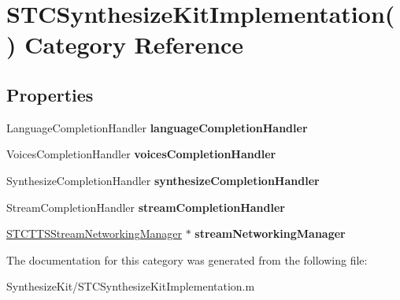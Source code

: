 \hypertarget{category_s_t_c_synthesize_kit_implementation_07_08}{}\section{S\+T\+C\+Synthesize\+Kit\+Implementation() Category Reference}
\label{category_s_t_c_synthesize_kit_implementation_07_08}
\subsection*{Properties}
\begin{DoxyCompactItemize}
\item 
\hypertarget{category_s_t_c_synthesize_kit_implementation_07_08_a18f3ce87d3638c98886c8ba913f99e4a}{}\label{category_s_t_c_synthesize_kit_implementation_07_08_a18f3ce87d3638c98886c8ba913f99e4a} 
Language\+Completion\+Handler {\bfseries language\+Completion\+Handler}
\item 
\hypertarget{category_s_t_c_synthesize_kit_implementation_07_08_a64baa9eb9aa6a784ae631dc81f05c972}{}\label{category_s_t_c_synthesize_kit_implementation_07_08_a64baa9eb9aa6a784ae631dc81f05c972} 
Voices\+Completion\+Handler {\bfseries voices\+Completion\+Handler}
\item 
\hypertarget{category_s_t_c_synthesize_kit_implementation_07_08_ad0a3a211b26e4a7f92fb6ceb09625821}{}\label{category_s_t_c_synthesize_kit_implementation_07_08_ad0a3a211b26e4a7f92fb6ceb09625821} 
Synthesize\+Completion\+Handler {\bfseries synthesize\+Completion\+Handler}
\item 
\hypertarget{category_s_t_c_synthesize_kit_implementation_07_08_a09db4e98fa0492e7629c9146500dcaf4}{}\label{category_s_t_c_synthesize_kit_implementation_07_08_a09db4e98fa0492e7629c9146500dcaf4} 
Stream\+Completion\+Handler {\bfseries stream\+Completion\+Handler}
\item 
\hypertarget{category_s_t_c_synthesize_kit_implementation_07_08_a06a4838ae1b32ad3a3607800063ff97a}{}\label{category_s_t_c_synthesize_kit_implementation_07_08_a06a4838ae1b32ad3a3607800063ff97a} 
\hyperlink{interface_s_t_c_t_t_s_stream_networking_manager}{S\+T\+C\+T\+T\+S\+Stream\+Networking\+Manager} $\ast$ {\bfseries stream\+Networking\+Manager}
\end{DoxyCompactItemize}


The documentation for this category was generated from the following file\+:\begin{DoxyCompactItemize}
\item 
Synthesize\+Kit/S\+T\+C\+Synthesize\+Kit\+Implementation.\+m\end{DoxyCompactItemize}
